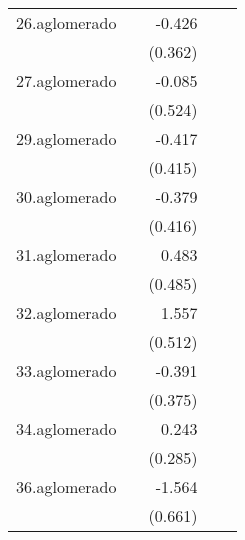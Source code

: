 {\begin{longtable}{l*{4}{D{.}{.}{-1}}}
\addlinespace
26.aglomerado&                     &      -0.426         &                     &                     \\
            &                     &     (0.362)         &                     &                     \\
\addlinespace
27.aglomerado&                     &      -0.085         &                     &                     \\
            &                     &     (0.524)         &                     &                     \\
\addlinespace
29.aglomerado&                     &      -0.417         &                     &                     \\
            &                     &     (0.415)         &                     &                     \\
\addlinespace
30.aglomerado&                     &      -0.379         &                     &                     \\
            &                     &     (0.416)         &                     &                     \\
\addlinespace
31.aglomerado&                     &       0.483         &                     &                     \\
            &                     &     (0.485)         &                     &                     \\
\addlinespace
32.aglomerado&                     &       1.557\sym{**} &                     &                     \\
            &                     &     (0.512)         &                     &                     \\
\addlinespace
33.aglomerado&                     &      -0.391         &                     &                     \\
            &                     &     (0.375)         &                     &                     \\
\addlinespace
34.aglomerado&                     &       0.243         &                     &                     \\
            &                     &     (0.285)         &                     &                     \\
\addlinespace
36.aglomerado&                     &      -1.564\sym{*}  &                     &                     \\
            &                     &     (0.661)         &                     &                     \\

\end{longtable}}
